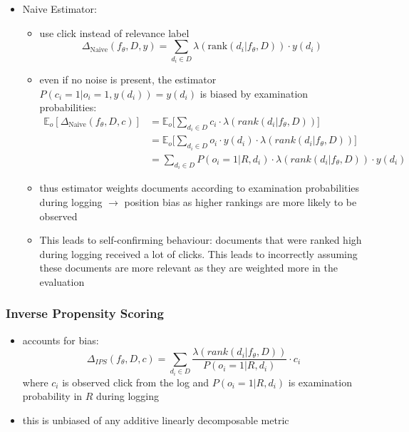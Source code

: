 \begin{itemize}
\begin{itemize}
		\item Naive Estimator:
		\begin{itemize}
			\item use click instead of relevance label
			$$ \Delta_{\mathrm{Naive}}(f_\theta, D, y) = \sum_{d_i \in D} \lambda (\mathrm{rank}(d_i | f_\theta, D)) \cdot y(d_i) $$
			\item even if no noise is present, the estimator $P(c_i = 1 | o_i = 1, y(d_i)) = y(d_i)$ is biased by examination probabilities:
			\begin{align*}
				\mathbb{E}_o [\Delta_{\mathrm{Naive}}(f_\theta,D,c)] &= \mathbb{E}_o \Big[ \sum_{d_i \in D} c_i \cdot \lambda (rank(d_i|f_\theta, D)) \Big] \\
				&= \mathbb{E}_o \Big[ \sum_{d_i \in D} o_i \cdot y(d_i) \cdot \lambda (rank(d_i|f_\theta, D)) \Big] \\	
				&= \sum_{d_i \in D} P(o_i = 1 | R, d_i) \cdot \lambda(rank(d_i |f_\theta, D)) \cdot y(d_i)
			\end{align*}
			\item thus estimator weights documents according to examination probabilities during logging $\rightarrow$ position bias as higher rankings are more likely to be observed
			\item This leads to self-confirming behaviour: documents that were ranked high during logging received a lot of clicks. This leads to incorrectly assuming these documents are more relevant as they are weighted more in the evaluation
		\end{itemize}
	\end{itemize}
\end{itemize}
\subsubsection{Inverse Propensity Scoring}
\begin{itemize}
	\item accounts for bias:
	$$ \Delta_{IPS}(f_\theta, D, c) = \sum_{d_i \in D} \dfrac{\lambda(rank(d_i |f_\theta, D))}{P(o_i = 1 |R,d_i)} \cdot c_i $$
	where $c_i$ is observed click from the log and $P(o_i = 1 |R,d_i)$ is examination probability in $R$ during logging
	\item this is unbiased of any additive linearly decomposable metric
\end{itemize}
